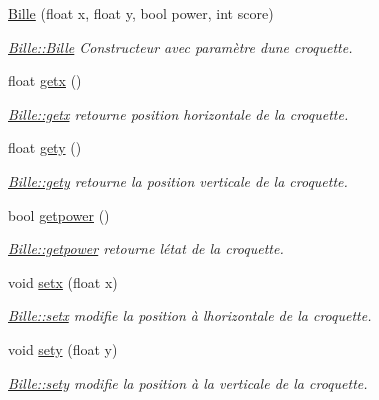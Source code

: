 \begin{DoxyCompactItemize}
\item 
\hyperlink{class_bille_aa12a5dbecb229554e06de7bd9508e871}{Bille} (float x, float y, bool power, int score)
\begin{DoxyCompactList}\small\item\em \hyperlink{class_bille_aa12a5dbecb229554e06de7bd9508e871}{Bille\+::\+Bille} Constructeur avec paramètre d\textquotesingle{}une croquette. \end{DoxyCompactList}\item 
float \hyperlink{class_bille_ab0b91419a53e0e230ecf16a7ecd27000}{getx} ()
\begin{DoxyCompactList}\small\item\em \hyperlink{class_bille_ab0b91419a53e0e230ecf16a7ecd27000}{Bille\+::getx} retourne position horizontale de la croquette. \end{DoxyCompactList}\item 
float \hyperlink{class_bille_a525786284e1df38307d6747dfa2a606c}{gety} ()
\begin{DoxyCompactList}\small\item\em \hyperlink{class_bille_a525786284e1df38307d6747dfa2a606c}{Bille\+::gety} retourne la position verticale de la croquette. \end{DoxyCompactList}\item 
bool \hyperlink{class_bille_ac86476f2d285f84b9bb72e95e4b58807}{getpower} ()
\begin{DoxyCompactList}\small\item\em \hyperlink{class_bille_ac86476f2d285f84b9bb72e95e4b58807}{Bille\+::getpower} retourne l\textquotesingle{}état de la croquette. \end{DoxyCompactList}\item 
void \hyperlink{class_bille_abc3342847cc689528859800d0d4e0c59}{setx} (float x)
\begin{DoxyCompactList}\small\item\em \hyperlink{class_bille_abc3342847cc689528859800d0d4e0c59}{Bille\+::setx} modifie la position à l\textquotesingle{}horizontale de la croquette. \end{DoxyCompactList}\item 
void \hyperlink{class_bille_af6f1656a7703044d0a7dbb9f5d2672d4}{sety} (float y)
\begin{DoxyCompactList}\small\item\em \hyperlink{class_bille_af6f1656a7703044d0a7dbb9f5d2672d4}{Bille\+::sety} modifie la position à la verticale de la croquette. \end{DoxyCompactList}\end{DoxyCompactItemize}

